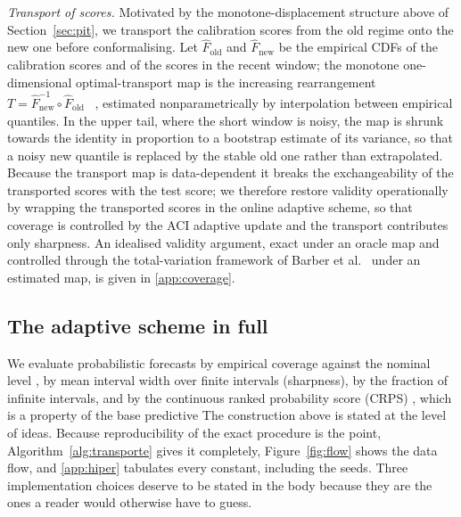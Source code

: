 \documentclass[preprint,3p,times]{elsarticle}
\providecommand{\DIFaddtex}[1]{{\protect\color{blue} \sf #1}} %
\providecommand{\DIFdeltex}[1]{{\protect\color{red} \scriptsize #1}} %
\providecommand{\DIFaddbegin}{} %
\providecommand{\DIFaddend}{} %
\providecommand{\DIFdelbegin}{} %
\providecommand{\DIFdelend}{} %
\providecommand{\DIFadd}[1]{\texorpdfstring{\DIFaddtex{#1}}{#1}} %
\providecommand{\DIFdel}[1]{\texorpdfstring{\DIFdeltex{#1}}{}} %
\begin{document}
\emph{Transport of scores.} Motivated by the monotone-displacement structure \DIFdelbegin \DIFdel{above}\DIFdelend \DIFaddbegin \DIFadd{of Section~\ref{sec:pit}}\DIFaddend , we transport the calibration scores from the old regime onto the new one before conformalising. Let $\hat F_{\mathrm{old}}$ and $\hat F_{\mathrm{new}}$ be the empirical CDFs of the calibration scores and of the scores in the recent window; the monotone one-dimensional optimal-transport map is the increasing rearrangement $T=\hat F_{\mathrm{new}}^{-1}\circ\hat F_{\mathrm{old}}$\DIFaddbegin \DIFadd{~\cite{peyre2019}}\DIFaddend , estimated nonparametrically by interpolation between empirical quantiles. In the upper tail, where the short window is noisy, the map is shrunk towards the identity in proportion to a bootstrap estimate of its variance, so that a noisy new quantile is replaced by the stable old one rather than extrapolated. Because the transport map is data-dependent it breaks the exchangeability of the transported scores with the test score; we therefore restore validity \DIFaddbegin \DIFadd{operationally }\DIFaddend by wrapping the transported scores in the online adaptive scheme, so that coverage is controlled by the \DIFdelbegin \DIFdel{ACI }\DIFdelend \DIFaddbegin \DIFadd{adaptive }\DIFaddend update and the transport contributes only sharpness. An idealised validity argument, exact under an oracle map and controlled through the total-variation framework of \DIFaddbegin \DIFadd{Barber et al.}\DIFaddend ~\cite{barber2023} under an estimated map, is given in \ref{app:coverage}.

\DIFdelbegin %
\DIFdelend \DIFaddbegin \subsection{The adaptive scheme in full}
\label{sec:algoritmo}
\DIFaddend 

\DIFdelbegin \DIFdel{We evaluate probabilistic forecasts by empirical coverage against the nominal level , by mean interval width over finite intervals (sharpness), by the fraction of infinite intervals, and by the continuous ranked probability score (CRPS) , which is a property of the base predictive }\DIFdelend \DIFaddbegin \DIFadd{The construction above is stated at the level of ideas. Because reproducibility of the exact procedure is the point, Algorithm~\ref{alg:transporte} gives it completely, Figure~\ref{fig:flow} shows the data flow, and \ref{app:hiper} tabulates every constant, including the seeds. Three implementation choices deserve to be stated in the body because they are the ones a reader would otherwise have to guess.
}
\end{document}
